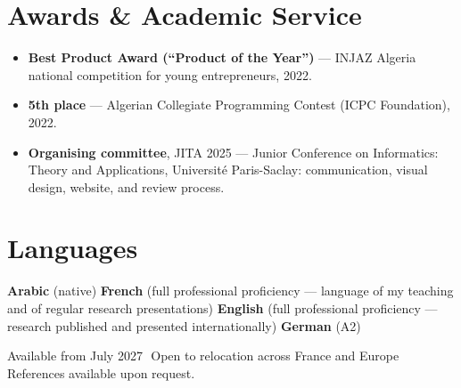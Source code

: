 \documentclass[a4paper,10pt]{article}
\newcommand{\cvsep}{\hspace{4pt}\textbar\hspace{4pt}}
\newcommand{\cvdot}{\,\textperiodcentered\,}
\begin{document}
\section*{Awards \& Academic Service}

\begin{itemize}
  \item \textbf{Best Product Award (``Product of the Year'')} --- INJAZ Algeria national competition for young entrepreneurs, 2022.
  \item \textbf{5th place} --- Algerian Collegiate Programming Contest (ICPC Foundation), 2022.
  \item \textbf{Organising committee}, JITA 2025 --- Junior Conference on Informatics: Theory and Applications, Universit\'e Paris-Saclay: communication, visual design, website, and review process.
\end{itemize}

\section*{Languages}

\textbf{Arabic} (native) \cvsep \textbf{French} (full professional proficiency --- language of my teaching and of regular research presentations) \cvsep \textbf{English} (full professional proficiency --- research published and presented internationally) \cvsep \textbf{German} (A2)

\vspace{7pt}
{\small Available from July 2027 \cvdot Open to relocation across France and Europe \cvdot References available upon request.}
\end{document}
